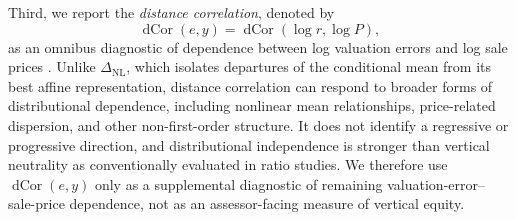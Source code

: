 \documentclass[10pt]{article}
\theoremstyle{definition}
\newcommand{\1}{\mathbf{1}}
\newcommand{\oldtext}[1]{\textcolor{blue}{\sout{#1}}}
\begin{document}
{\color{impGreen}Third, we report the \emph{distance correlation}, denoted by}
\begin{equation}
\label{eq:dcor_diagnostic}
\operatorname{dCor}(e,y)
=
\operatorname{dCor}(\log r,\log P),
\end{equation}
{\color{impGreen}as an omnibus diagnostic of dependence between log valuation errors and log sale prices \cite{SzekelyRizzoBakirov2007}. Unlike $\Delta_{\mathrm{NL}}$, which isolates departures of the conditional mean from its best affine representation, distance correlation can respond to broader forms of distributional dependence, including nonlinear mean relationships, price-related dispersion, and other non-first-order structure. It does not identify a regressive or progressive direction, and distributional independence is stronger than vertical neutrality as conventionally evaluated in ratio studies. We therefore use $\operatorname{dCor}(e,y)$ only as a supplemental diagnostic of remaining valuation-error--sale-price dependence, not as an assessor-facing measure of vertical equity.}
\end{document}
